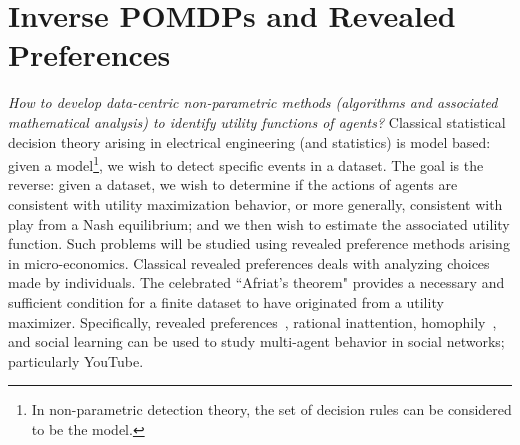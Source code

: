 \documentclass[draftcls,onecolumn]{IEEEtran}
\begin{document}
\section{Inverse POMDPs and Revealed Preferences}
{\em How to develop data-centric non-parametric methods (algorithms and associated mathematical analysis) to identify utility functions of agents?}
Classical statistical decision theory  arising in electrical engineering (and statistics) is model based: given a model\footnote{In non-parametric detection theory, the set of decision rules can be considered to be the model.}, we wish to detect specific events in a dataset.  The  goal is the reverse:
given a dataset, we wish to determine  if 
the actions of  agents are consistent with  utility maximization behavior, or more generally, consistent with play from a  Nash equilibrium; and  we then wish to 
estimate the associated utility function. Such problems will be studied using  revealed preference methods arising in  micro-economics. Classical revealed preferences deals with
analyzing choices made by individuals.  The celebrated  ``Afriat's theorem" \cite{Var82,Blu05} provides a necessary and sufficient condition for a finite dataset  to have originated from a utility maximizer.
Specifically,  revealed preferences~\cite{KH15,HNK15,HKA16}, rational inattention, homophily~\cite{NHK16}, and social learning can be used to study 
multi-agent behavior in  social networks; particularly YouTube.



%
%
%
\end{document}
